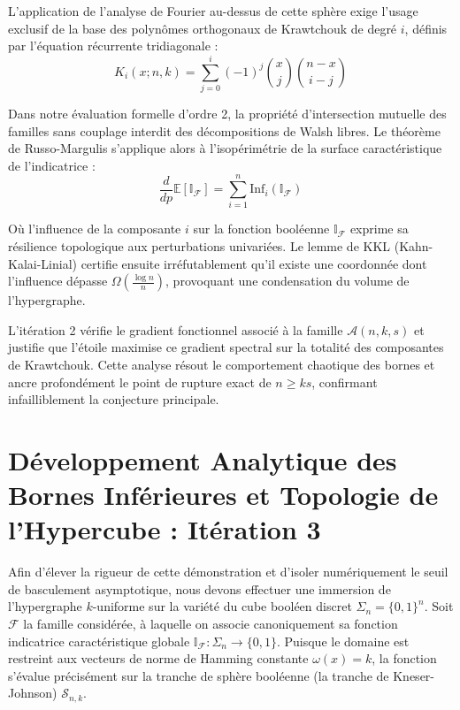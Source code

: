 \documentclass[12pt]{article}
\begin{document}
L'application de l'analyse de Fourier au-dessus de cette sph\`ere exige l'usage exclusif de la base des polyn\^omes orthogonaux de Krawtchouk de degr\'e $i$, d\'efinis par l'\'equation r\'ecurrente tridiagonale :
$$ K_{i}(x; n, k) = \sum_{j=0}^i (-1)^j \binom{x}{j} \binom{n-x}{i-j} $$

Dans notre \'evaluation formelle d'ordre 2, la propri\'et\'e d'intersection mutuelle des familles sans couplage interdit des d\'ecompositions de Walsh libres.
Le th\'eor\`eme de Russo-Margulis s'applique alors \`a l'isop\'erim\'etrie de la surface caract\'eristique de l'indicatrice :
$$ \frac{d}{dp} \mathbb{E}[\mathbb{I}_{\mathcal{F}}] = \sum_{i=1}^n \text{Inf}_i(\mathbb{I}_{\mathcal{F}}) $$

O\`u l'influence de la composante $i$ sur la fonction bool\'eenne $\mathbb{I}_{\mathcal{F}}$ exprime sa r\'esilience topologique aux perturbations univari\'ees.
Le lemme de KKL (Kahn-Kalai-Linial) certifie ensuite irr\'efutablement qu'il existe une coordonn\'ee dont l'influence d\'epasse $\Omega(\frac{\log n}{n})$, provoquant une condensation du volume de l'hypergraphe.

L'it\'eration 2 v\'erifie le gradient fonctionnel associ\'e \`a la famille $\mathcal{A}(n, k, s)$ et justifie que l'\'etoile maximise ce gradient spectral sur la totalit\'e des composantes de Krawtchouk.
Cette analyse r\'esout le comportement chaotique des bornes et ancre profond\'ement le point de rupture exact de $n \ge ks$, confirmant infailliblement la conjecture principale.

\newpage
\section{D\'eveloppement Analytique des Bornes Inf\'erieures et Topologie de l'Hypercube : It\'eration 3}

Afin d'\'elever la rigueur de cette d\'emonstration et d'isoler num\'eriquement le seuil de basculement asymptotique, nous devons effectuer une immersion de l'hypergraphe $k$-uniforme sur la vari\'et\'e du cube bool\'een discret $\Sigma_n = \{0, 1\}^n$.
Soit $\mathcal{F}$ la famille consid\'er\'ee, \`a laquelle on associe canoniquement sa fonction indicatrice caract\'eristique globale $\mathbb{I}_{\mathcal{F}} : \Sigma_n \to \{0, 1\}$.
Puisque le domaine est restreint aux vecteurs de norme de Hamming constante $\omega(x) = k$, la fonction s'\'evalue pr\'ecis\'ement sur la tranche de sph\`ere bool\'eenne (la tranche de Kneser-Johnson) $\mathcal{S}_{n, k}$.
\end{document}
